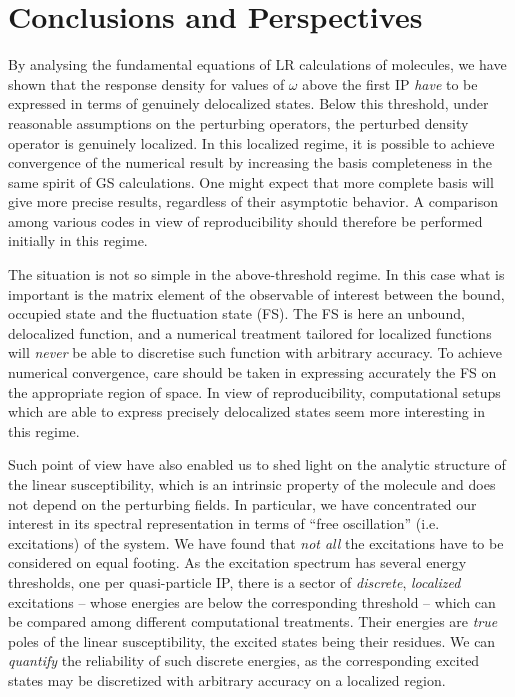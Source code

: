 \documentclass[reprint,aps,prb]{revtex4-1}
\begin{document}
\section{Conclusions and Perspectives}

By analysing the fundamental equations of LR calculations of molecules, we have shown that the response density for values of $\omega$ above the first IP
\emph{have} to be expressed in terms of genuinely delocalized states.
Below this threshold,
under reasonable assumptions on the perturbing operators,
the perturbed density operator is genuinely localized.
In this localized regime, it is possible to achieve convergence of the numerical result
by increasing the basis completeness in the same spirit of GS calculations.
One might expect that more complete basis will give more precise results, regardless of their asymptotic behavior.
A comparison among various codes in view of reproducibility should therefore be performed
initially in this regime.

The situation is not so simple in the above-threshold regime.
In this case what is important is the matrix element of the observable of interest
between the bound, occupied state and the fluctuation state (FS).
The FS is here an unbound, delocalized function, and a numerical treatment tailored for localized functions will \emph{never} be able to discretise such function with arbitrary accuracy.
To achieve numerical convergence, care should be taken in expressing accurately the FS on the
appropriate region of space. In view of reproducibility, computational setups which are able to express precisely
delocalized states seem more interesting in this regime.

Such point of view have also enabled us to shed light on the analytic structure of the
linear susceptibility, which is an intrinsic property of the molecule and does not depend on
 the perturbing fields.
 In particular, we have concentrated our interest in its spectral representation in
 terms of ``free oscillation'' (i.e. excitations) of the system.
 We have found that \emph{not all} the excitations have to be considered on equal footing.
 As the excitation spectrum has several energy thresholds, one per quasi-particle IP,
 there is a sector of \emph{discrete}, \emph{localized} excitations -- whose energies are
below the corresponding threshold -- which can be compared among different computational treatments.
Their energies are \emph{true} poles of the linear susceptibility, the excited states being their residues. We can \emph{quantify} the reliability of such discrete energies, as the corresponding excited states may be discretized with arbitrary accuracy on a localized region.
\end{document}
